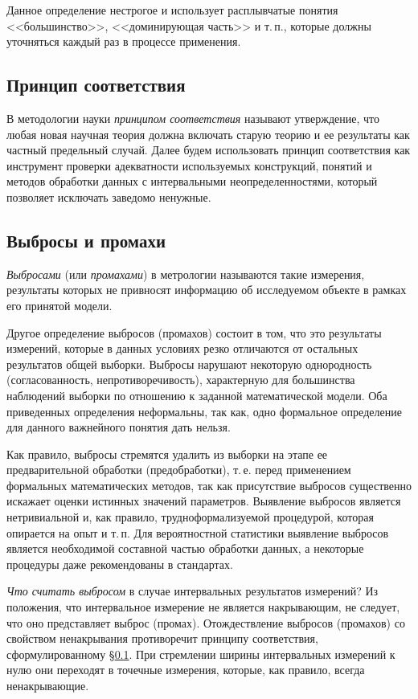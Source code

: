 \documentclass[a5paper,openany]{book}
\begin{document}
Данное определение нестрогое и использует расплывчатые понятия <<большинство>>, 
<<доминирующая часть>> и т.\,п., которые должны уточняться каждый раз в процессе 
применения. 


\subsection{Принцип соответствия} 
\label{CorresPrincpSect}

В методологии науки \textit{принципом соответствия} называют утверждение, что любая 
новая научная теория должна включать старую теорию и ее результаты как частный 
предельный случай. 	Далее будем использовать принцип соответствия как инструмент проверки адекватности используемых конструкций, понятий и методов обработки данных с интервальными 
неопределенностями, который позволяет исключать заведомо ненужные.

\subsection{Выбросы и промахи} 
\label{OutlierSect}

\textit{Выбросами} (или \textit{промахами}) в метрологии называются такие измерения, 
результаты которых не привносят информацию об исследуемом объекте в рамках его 
принятой модели. 

Другое определение выбросов (промахов) состоит в том, что это результаты 
измерений, которые в данных условиях резко отличаются от остальных результатов общей 
выборки. Выбросы нарушают некоторую однородность (согласованность, непротиворечивость), 
характерную для большинства наблюдений выборки по отношению к заданной математической 
модели. 
Оба приведенных определения неформальны, так как, одно формальное 
определение для данного важнейного понятия дать нельзя.  

Как правило, выбросы стремятся удалить из выборки на этапе ее предварительной 
обработки (предобработки), т.\,е. перед применением  формальных 
математических методов, так как присутствие выбросов существенно искажает оценки 
истинных значений параметров. Выявление выбросов является нетривиальной и, как правило, 
трудноформализуемой процедурой, которая опирается на опыт и т.\,п. Для вероятностной 
статистики выявление выбросов является необходимой составной частью обработки данных, 
а некоторые процедуры даже рекомендованы в стандартах. 

\emph{Что считать выбросом} в случае интервальных результатов измерений? 
Из положения, что интервальное измерение не является 
накрывающим, не следует, что оно представляет выброс (промах). 
Отождествление выбросов (промахов) со свойством ненакрывания противоречит 
принципу соответствия, сформулированному \S\ref{CorresPrincpSect}. При стремлении ширины интервальных измерений к нулю они переходят в точечные 
измерения, которые, как правило, всегда ненакрывающие. 
\end{document}
